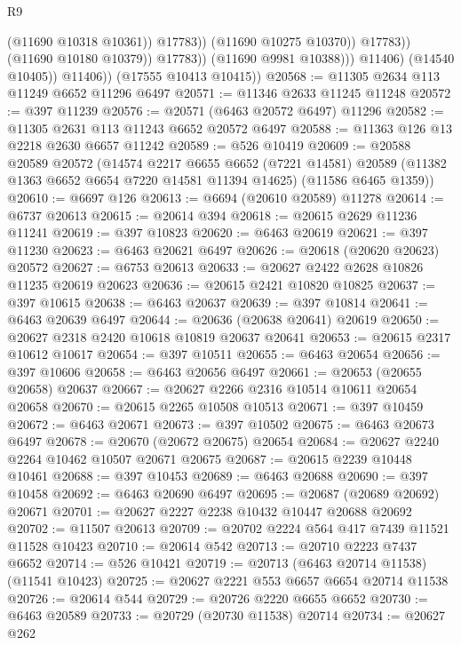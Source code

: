 \begin{lexlean}{R9}
\begin{coremodule}
                                    (@11690 @10318 @10361))
                                  @17783))
                              (@11690 @10275 @10370))
                            @17783))
                        (@11690 @10180 @10379))
                      @17783))
                  (@11690 @9981 @10388)))
              @11406)
            (@14540 @10405))
          @11406))
      (@17555 @10413 @10415))
@20568 := @11305 @2634 @113 @11249 @6652 @11296 @6497
@20571 := @11346 @2633 @11245 @11248
@20572 := @397 @11239
@20576 := @20571 (@6463 @20572 @6497) @11296
@20582 := @11305 @2631 @113 @11243 @6652 @20572 @6497
@20588 := @11363 @126 @13 @2218 @2630 @6657 @11242
@20589 := @526 @10419
@20609 := @20588
    @20589
    @20572
    (@14574
      @2217
      @6655
      @6652
      (@7221 @14581)
      @20589
      (@11382 @1363 @6652 @6654 @7220 @14581 @11394 @14625)
      (@11586 @6465 @1359))
@20610 := @6697 @126
@20613 := @6694 (@20610 @20589) @11278
@20614 := @6737 @20613
@20615 := @20614 @394
@20618 := @20615 @2629 @11236 @11241
@20619 := @397 @10823
@20620 := @6463 @20619
@20621 := @397 @11230
@20623 := @6463 @20621 @6497
@20626 := @20618 (@20620 @20623) @20572
@20627 := @6753 @20613
@20633 := @20627 @2422 @2628 @10826 @11235 @20619 @20623
@20636 := @20615 @2421 @10820 @10825
@20637 := @397 @10615
@20638 := @6463 @20637
@20639 := @397 @10814
@20641 := @6463 @20639 @6497
@20644 := @20636 (@20638 @20641) @20619
@20650 := @20627 @2318 @2420 @10618 @10819 @20637 @20641
@20653 := @20615 @2317 @10612 @10617
@20654 := @397 @10511
@20655 := @6463 @20654
@20656 := @397 @10606
@20658 := @6463 @20656 @6497
@20661 := @20653 (@20655 @20658) @20637
@20667 := @20627 @2266 @2316 @10514 @10611 @20654 @20658
@20670 := @20615 @2265 @10508 @10513
@20671 := @397 @10459
@20672 := @6463 @20671
@20673 := @397 @10502
@20675 := @6463 @20673 @6497
@20678 := @20670 (@20672 @20675) @20654
@20684 := @20627 @2240 @2264 @10462 @10507 @20671 @20675
@20687 := @20615 @2239 @10448 @10461
@20688 := @397 @10453
@20689 := @6463 @20688
@20690 := @397 @10458
@20692 := @6463 @20690 @6497
@20695 := @20687 (@20689 @20692) @20671
@20701 := @20627 @2227 @2238 @10432 @10447 @20688 @20692
@20702 := @11507 @20613
@20709 := @20702 @2224 @564 @417 @7439 @11521 @11528 @10423
@20710 := @20614 @542
@20713 := @20710 @2223 @7437 @6652
@20714 := @526 @10421
@20719 := @20713 (@6463 @20714 @11538) (@11541 @10423)
@20725 := @20627 @2221 @553 @6657 @6654 @20714 @11538
@20726 := @20614 @544
@20729 := @20726 @2220 @6655 @6652
@20730 := @6463 @20589
@20733 := @20729 (@20730 @11538) @20714
@20734 := @20627 @262

\end{coremodule}
\end{lexlean}
